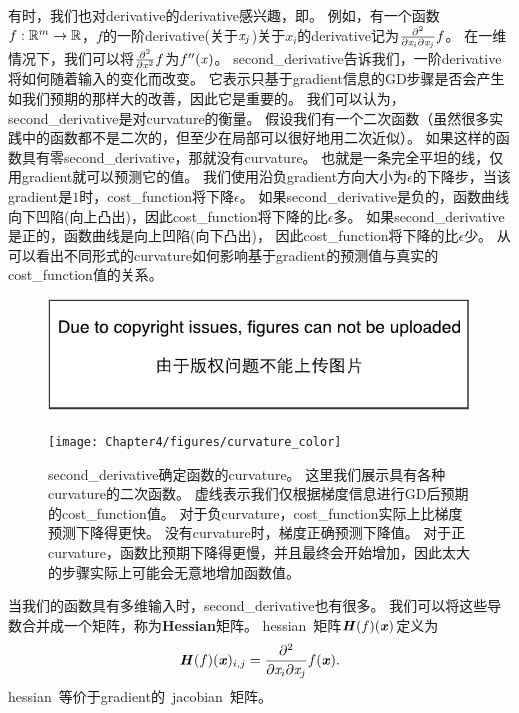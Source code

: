 有时，我们也对\gls{derivative}的\gls{derivative}感兴趣，即。
例如，有一个函数$f: \mathbb{R}^m \rightarrow \mathbb{R}$，$f$的一阶\gls{derivative}(关于$\mathit{x}_j$)关于$x_i$的\gls{derivative}记为$\frac{\partial^2}{\partial \mathit{x}_i \partial \mathit{x}_j} f$。
在一维情况下，我们可以将$\frac{\partial^2}{\partial \mathit{x}^2} f$为$f''(\mathit{x})$。
\gls{second_derivative}告诉我们，一阶\gls{derivative}将如何随着输入的变化而改变。
它表示只基于\gls{gradient}信息的\gls{GD}步骤是否会产生如我们预期的那样大的改善，因此它是重要的。
我们可以认为，\gls{second_derivative}是对\gls{curvature}的衡量。
假设我们有一个二次函数（虽然很多实践中的函数都不是二次的，但至少在局部可以很好地用二次近似）。
如果这样的函数具有零\gls{second_derivative}，那就没有\gls{curvature}。
也就是一条完全平坦的线，仅用\gls{gradient}就可以预测它的值。
我们使用沿负\gls{gradient}方向大小为$\epsilon$的下降步，当该\gls{gradient}是$1$时，\gls{cost_function}将下降$\epsilon$。
如果\gls{second_derivative}是负的，函数曲线向下凹陷(向上凸出)，因此\gls{cost_function}将下降的比$\epsilon$多。
如果\gls{second_derivative}是正的，函数曲线是向上凹陷(向下凸出)，
因此\gls{cost_function}将下降的比$\epsilon$少。
从可以看出不同形式的\gls{curvature}如何影响基于\gls{gradient}的预测值与真实的\gls{cost_function}值的关系。
\begin{figure}[!htb]
\ifOpenSource
\centerline{\includegraphics{figure.pdf}}
\else
\centerline{\texttt{[image: Chapter4/figures/curvature\_color]}}
\fi
\caption{\gls{second_derivative}确定函数的\gls{curvature}。
这里我们展示具有各种\gls{curvature}的二次函数。
虚线表示我们仅根据梯度信息进行\gls{GD}后预期的\gls{cost_function}值。
对于负\gls{curvature}，\gls{cost_function}实际上比梯度预测下降得更快。
没有\gls{curvature}时，梯度正确预测下降值。
对于正\gls{curvature}，函数比预期下降得更慢，并且最终会开始增加，因此太大的步骤实际上可能会无意地增加函数值。
}
\label{fig:chap4_curvature_color}
\end{figure}

当我们的函数具有多维输入时，\gls{second_derivative}也有很多。
我们可以将这些导数合并成一个矩阵，称为\textbf{Hessian}矩阵。
\gls{hessian}~矩阵$\boldsymbol{\mathit{H}}(f)(\boldsymbol{\mathit{x}})$定义为
\begin{align}
 \boldsymbol{\mathit{H}}(f)(\boldsymbol{\mathit{x}})_{i,j} = \frac{\partial^2}{\partial \mathit{x}_i \partial  \mathit{x}_j} f(\boldsymbol{\mathit{x}}).
\end{align}
\gls{hessian}~等价于\gls{gradient}的~\gls{jacobian}~矩阵。

